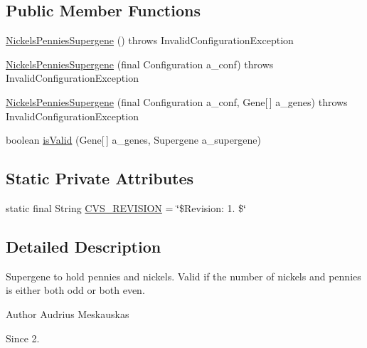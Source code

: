 \subsection*{Public Member Functions}
\begin{DoxyCompactItemize}
\item 
\hyperlink{classexamples_1_1supergene_1_1_nickels_pennies_supergene_a528766cf0f725e41a19e8ec340db3b4c}{Nickels\-Pennies\-Supergene} ()  throws Invalid\-Configuration\-Exception 
\item 
\hyperlink{classexamples_1_1supergene_1_1_nickels_pennies_supergene_aad9a79609258e97d8aeed5364c6b8faa}{Nickels\-Pennies\-Supergene} (final Configuration a\-\_\-conf)  throws Invalid\-Configuration\-Exception 
\item 
\hyperlink{classexamples_1_1supergene_1_1_nickels_pennies_supergene_a83c6b3e7c35591dc7bdb55c2da278233}{Nickels\-Pennies\-Supergene} (final Configuration a\-\_\-conf, Gene\mbox{[}$\,$\mbox{]} a\-\_\-genes)  throws Invalid\-Configuration\-Exception 
\item 
boolean \hyperlink{classexamples_1_1supergene_1_1_nickels_pennies_supergene_a412430fbe022d7dec0fa3db0db42fc6f}{is\-Valid} (Gene\mbox{[}$\,$\mbox{]} a\-\_\-genes, Supergene a\-\_\-supergene)
\end{DoxyCompactItemize}
\subsection*{Static Private Attributes}
\begin{DoxyCompactItemize}
\item 
static final String \hyperlink{classexamples_1_1supergene_1_1_nickels_pennies_supergene_a5cc0480f37ef8bd5731aeb6c161be7e4}{C\-V\-S\-\_\-\-R\-E\-V\-I\-S\-I\-O\-N} = \char`\"{}\$Revision\-: 1. \$\char`\"{}
\end{DoxyCompactItemize}


\subsection{Detailed Description}
Supergene to hold pennies and nickels. Valid if the number of nickels and pennies is either both odd or both even.

\begin{DoxyAuthor}{Author}
Audrius Meskauskas 
\end{DoxyAuthor}
\begin{DoxySince}{Since}
2. 
\end{DoxySince}


